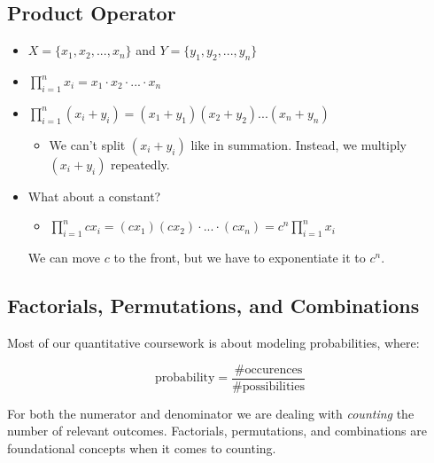 \subsection{Product Operator}

\begin{itemize}
    \item $X = \{x_1, x_2, ..., x_n\}$ and $Y = \{y_1, y_2, ..., y_n\}$ 
    \item $\prod\limits_{i=1}^n x_i = x_1 \cdot x_2 \cdot ... \cdot x_n$
    \item $\prod\limits_{i=1}^n (x_i + y_i) = (x_1 + y_1)(x_2 + y_2) ...
        (x_n + y_n)$
    \begin{itemize}
        \item We can't split $(x_i + y_i)$ like in summation. Instead, we multiply $(x_i + y_i)$ repeatedly.
    \end{itemize}
    \item What about a constant? 
    \begin{itemize}
        \item $\prod\limits_{i = 1}^{n} cx_i = (cx_1)(cx_2) \cdot ... \cdot
            (cx_n) = c^n\prod\limits_{i = 1}^{n} x_i$
    \end{itemize}
    We can move $c$ to the front, but we have to exponentiate it to $c^n$.
\end{itemize}

\subsection{Factorials, Permutations, and Combinations}

Most of our quantitative coursework is about modeling probabilities, where: 

\begin{equation*}
    \text{probability} = \frac{\# \text{occurences}}{\# \text{possibilities}}
\end{equation*}

\noindent For both the numerator and denominator we are dealing with \emph{counting} the number of relevant outcomes. Factorials, permutations, and combinations are foundational concepts when it comes to counting. 

